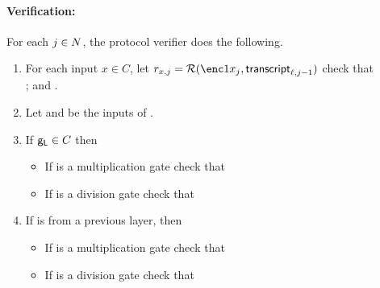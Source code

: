 \documentclass{article}
\begin{document}
\paragraph{Verification:\\}
\noindent
 For each $j\in N$, the protocol verifier does the following.
\begin{enumerate}
\item For each input $x\in C$, let $r_{x,j}= \RO(\enc1{x_j},\transcript_{\ell,j-1})$  check that \\
;
and .
 
 \item Let \leftinp and \rightinp be the inputs of \gate.  
 \item If $\mathsf{g}_{\mathsf{L}}\in C$ then 
 \begin{itemize}
  \item If \gate is a multiplication gate check that 
   \item If \gate is a division gate check that 
 \end{itemize}
\item  If \leftinp is from a previous layer, then
\begin{itemize}
\item If \gate is a multiplication gate check that 
   \item If \gate is a division gate check that 
\end{itemize}

 \end{enumerate}


\newcommand{\randoutput}{\ensuremath{\circ_S}\xspace}
\newcommand{\protoutput}{\ensuremath{\circ_\adv}\xspace}
\newcommand{\extra}{\ensuremath{\mathsf{z}}\xspace}
\newcommand{\advantage}[2]{\ensuremath{\mathrm{adv}_{#1,#2}}\xspace}
\newcommand{\advv}{\ensuremath{{\cal B}}\xspace}
\newcommand{\advvprime}{\ensuremath{{\advv^*}}\xspace}
\newcommand{\mulofcirc}{\ensuremath{\mathrm{M}_\circ}\xspace} %
\newcommand{\muloflayer}[1]{\ensuremath{\mathrm{M}_{#1}}\xspace} %
\newcommand{\honestrand}{\ensuremath{\mathsf{rand_{honest}}}\xspace}
\newcommand{\oraclerand}{\ensuremath{\mathsf{rand_{oracle}}}\xspace}
\newcommand{\advvprimerand}{\ensuremath{\mathsf{rand_{\advvprime}}}\xspace}
\newcommand{\params}{\ensuremath{\mathsf{params}}\xspace}
\newcommand{\randdomain}{\ensuremath{\mathcal X}\xspace}
\newcommand{\honestinputs}{\ensuremath{H}\xspace}
\end{document}

